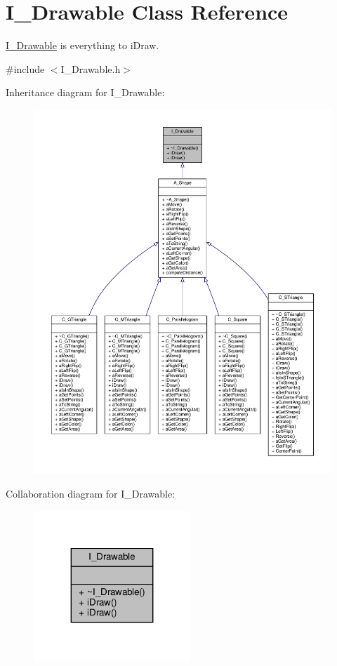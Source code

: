 \hypertarget{classI__Drawable}{}\section{I\+\_\+\+Drawable Class Reference}
\label{classI__Drawable}


\hyperlink{classI__Drawable}{I\+\_\+\+Drawable} is everything to i\+Draw.  




{\ttfamily \#include $<$I\+\_\+\+Drawable.\+h$>$}



Inheritance diagram for I\+\_\+\+Drawable\+:
\nopagebreak
\begin{figure}[H]
\begin{center}
\leavevmode
\includegraphics[width=350pt]{classI__Drawable__inherit__graph}
\end{center}
\end{figure}


Collaboration diagram for I\+\_\+\+Drawable\+:
\nopagebreak
\begin{figure}[H]
\begin{center}
\leavevmode
\includegraphics[width=167pt]{classI__Drawable__coll__graph}
\end{center}
\end{figure}
